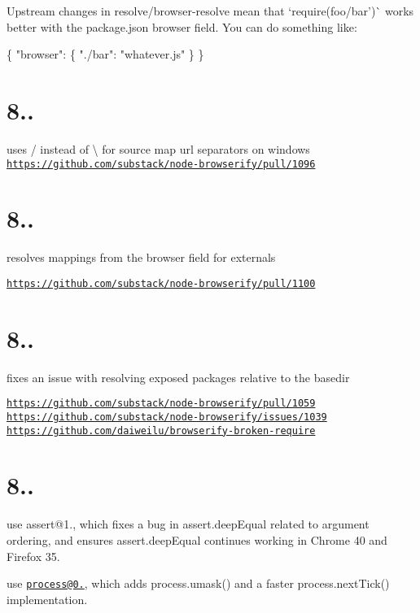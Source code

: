Upstream changes in resolve/browser-\/resolve mean that `require(\textquotesingle{}foo/bar')\`{} works better with the package.\+json browser field. You can do something like\+:


\begin{DoxyCode}
\{
  "browser": \{ "./bar": "whatever.js" \}
\}
\end{DoxyCode}


\section*{8..}

uses / instead of \textbackslash{} for source map url separators on windows \href{https://github.com/substack/node-browserify/pull/1096}{\tt https\+://github.\+com/substack/node-\/browserify/pull/1096}

\section*{8..}

resolves mappings from the browser field for externals

\href{https://github.com/substack/node-browserify/pull/1100}{\tt https\+://github.\+com/substack/node-\/browserify/pull/1100}

\section*{8..}

fixes an issue with resolving exposed packages relative to the basedir

\href{https://github.com/substack/node-browserify/pull/1059}{\tt https\+://github.\+com/substack/node-\/browserify/pull/1059} \href{https://github.com/substack/node-browserify/issues/1039}{\tt https\+://github.\+com/substack/node-\/browserify/issues/1039} \href{https://github.com/daiweilu/browserify-broken-require}{\tt https\+://github.\+com/daiweilu/browserify-\/broken-\/require}

\section*{8..}

use assert@1., which fixes a bug in assert.\+deep\+Equal related to argument ordering, and ensures assert.\+deep\+Equal continues working in Chrome 40 and Firefox 35.

use \href{mailto:process@0.10}{\tt process@0.}, which adds process.\+umask() and a faster process.\+next\+Tick() implementation.

